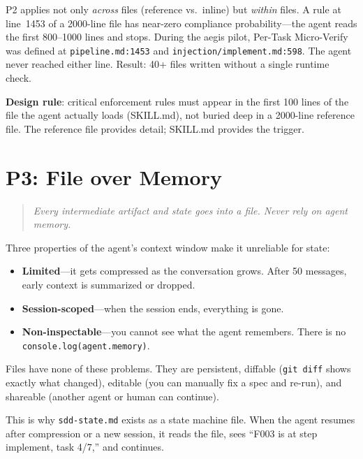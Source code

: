 \documentclass[11pt,a4paper,openright,twoside]{report}
\newcommand{\file}[1]{\texttt{#1}}
\begin{document}
\begin{warnbox}
P2 applies not only \emph{across} files (reference vs.\ inline) but \emph{within} files. A rule at line~1453 of a 2000-line file has near-zero compliance probability---the agent reads the first 800--1000 lines and stops. During the aegis pilot, Per-Task Micro-Verify was defined at \texttt{pipeline.md:1453} and \texttt{injection/implement.md:598}. The agent never reached either line. Result: 40+ files written without a single runtime check.

\textbf{Design rule}: critical enforcement rules must appear in the first 100 lines of the file the agent actually loads (SKILL.md), not buried deep in a 2000-line reference file. The reference file provides detail; SKILL.md provides the trigger.
\end{warnbox}


\section{P3: File over Memory}

\begin{quote}
\emph{Every intermediate artifact and state goes into a file. Never rely on agent memory.}
\end{quote}

Three properties of the agent's context window make it unreliable for state:

\begin{itemize}
  \item \textbf{Limited}---it gets compressed as the conversation grows. After 50 messages, early context is summarized or dropped.
  \item \textbf{Session-scoped}---when the session ends, everything is gone.
  \item \textbf{Non-inspectable}---you cannot see what the agent remembers. There is no \texttt{console.log(agent.memory)}.
\end{itemize}

Files have none of these problems. They are persistent, diffable (\texttt{git diff} shows exactly what changed), editable (you can manually fix a spec and re-run), and shareable (another agent or human can continue).

This is why \file{sdd-state.md} exists as a state machine file. When the agent resumes after compression or a new session, it reads the file, sees ``F003 is at step implement, task 4/7,'' and continues.
\end{document}
